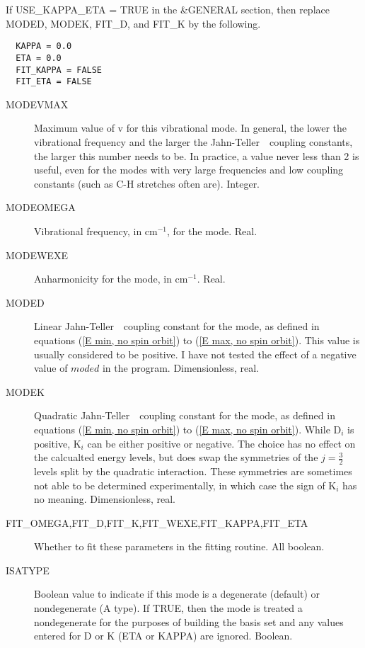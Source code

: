 \documentclass{article}
\newcommand{\wn}{cm$^{-1}$}
\newcommand{\JT}{Jahn-Teller\ }
\begin{document}
If USE\_KAPPA\_ETA = TRUE in the \&GENERAL section, then replace MODED, MODEK, FIT\_D, and FIT\_K by the following.

\begin{verbatim}
  KAPPA = 0.0
  ETA = 0.0
  FIT_KAPPA = FALSE
  FIT_ETA = FALSE
\end{verbatim}

\begin{description}

\item[MODEVMAX] Maximum value of v for this vibrational mode. In
  general, the lower the vibrational frequency and the larger the \JT\
  coupling constants, the larger this number needs to be. In practice,
  a value never less than 2 is useful, even for the modes with very
  large frequencies and low coupling constants (such as C-H stretches
  often are). Integer.

\item[MODEOMEGA] Vibrational frequency, in \wn , for the mode. Real.

\item[MODEWEXE] Anharmonicity for the mode, in \wn . Real.

\item[MODED] Linear \JT\ coupling constant for the mode, as defined in
  equations (\ref{E min, no spin orbit}) to (\ref{E max, no spin
    orbit}). This value is usually considered to be positive. I have
  not tested the effect of a negative value of $moded$ in the
  program. Dimensionless, real.

\item[MODEK] Quadratic \JT\ coupling constant for the mode, as
  defined in equations (\ref{E min, no spin orbit}) to (\ref{E max, no spin
    orbit}). While D$_i$ is positive, K$_i$ can be either positive or
  negative. The choice has no effect on the calcualted energy levels,
  but does swap the symmetries of the $j=\frac{3}{2}$ levels split by
  the quadratic interaction. These symmetries are sometimes not able to be
  determined experimentally, in which case the sign of K$_i$ has
  no meaning. Dimensionless, real.

\item[FIT\_OMEGA,FIT\_D,FIT\_K,FIT\_WEXE,FIT\_KAPPA,FIT\_ETA] Whether to fit these
  parameters in the fitting routine.  All boolean.
  
\item[ISATYPE] Boolean value to indicate if this mode is a degenerate (default) or
  nondegenerate (A type). If TRUE, then the mode is treated a nondegenerate for the purposes
  of building the basis set and any values entered for D or K (ETA or KAPPA) are ignored. Boolean.


\end{description}
\end{document}
